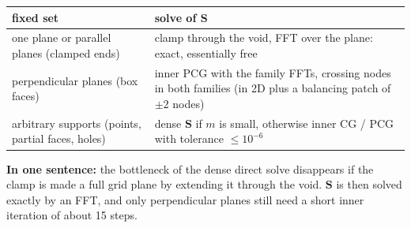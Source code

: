 \documentclass[11pt,a4paper]{article}
\begin{document}
\begin{center}
\small
\begin{tabular}{p{}p{}}
  \toprule
  fixed set & solve of $\mathbf{S}$ \\
  \midrule
  one plane or parallel planes (clamped ends) & clamp through the void, FFT over the plane: exact, essentially free \\
  perpendicular planes (box faces) & inner PCG with the family FFTs, crossing nodes in both families (in 2D plus a
  balancing patch of $\pm2$ nodes) \\
  arbitrary supports (points, partial faces, holes) & dense $\mathbf{S}$ if $m$ is small, otherwise inner CG / PCG with
  tolerance $\le 10^{-6}$ \\
  \bottomrule
\end{tabular}
\end{center}

\noindent\textbf{In one sentence:} the bottleneck of the dense direct solve disappears if the clamp is made a full grid
plane by extending it through the void. $\mathbf{S}$ is then solved exactly by an FFT, and only perpendicular planes
still need a short inner iteration of about 15 steps.
\end{document}
